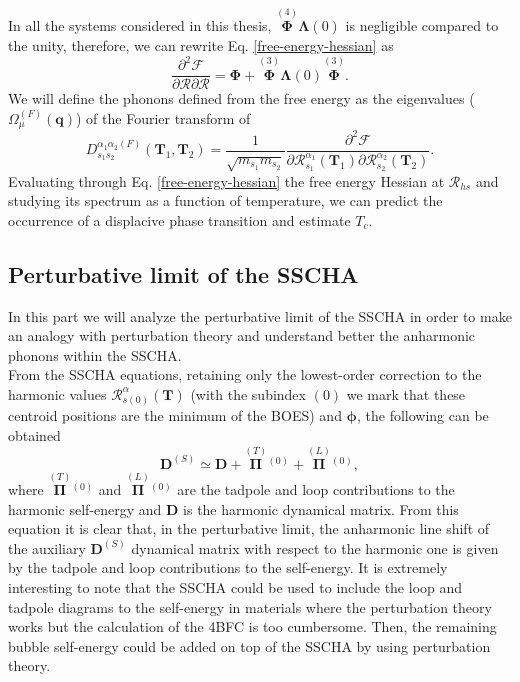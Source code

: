 In all the systems considered in this thesis, $\overset{(4)}{\boldsymbol{\Phi}}\boldsymbol{\Lambda}(0)$ is negligible compared to the unity, therefore, we can rewrite Eq. \ref{free-energy-hessian} as
\begin{equation}
 \frac{\partial^{2}\mathcal{F}}{\partial\boldsymbol{\mathcal{R}}\partial\boldsymbol{\mathcal{R}}}=\boldsymbol{\Phi}+\overset{(3)}{\boldsymbol{\Phi}}\boldsymbol{\Lambda}(0)\overset{(3)}{\boldsymbol{\Phi}}.
\end{equation}
We will define the phonons defined from the free energy as the eigenvalues ($\Omega^{(F)}_{\mu}(\boldsymbol{q})$) of
the Fourier transform of
\begin{equation}
 \label{free-energy-dynamical-matrix}
 D_{s_{1}s_{2}}^{\alpha_{1}\alpha_{2}(F)}(\mathbf{T}_{1},\mathbf{T}_{2})=\frac{1}{\sqrt{m_{s_{1}}m_{s_{2}}}}\frac{\partial^{2}\mathcal{F}}{\partial\mathcal{R}_{s_{1}}^{\alpha_{1}}(\mathbf{T}_{1})\partial\mathcal{R}_{s_{2}}^{\alpha_{
 2}}(\mathbf{T}_{2})}.
\end{equation} 
Evaluating through Eq. \ref{free-energy-hessian} the free energy Hessian at $\boldsymbol{\mathcal{R}}_{hs}$ and studying its spectrum as a function of temperature, we can predict the occurrence of a displacive phase transition 
and estimate $T_{c}$. 

\subsection{Perturbative limit of the SSCHA}
\label{pertubative-limit-sscha}

In this part we will analyze the perturbative limit of the SSCHA in order to make an analogy with perturbation theory and understand better the anharmonic phonons within the SSCHA. \\

From the SSCHA equations, retaining only the lowest-order correction to the harmonic values $\mathcal{R}_{s(0)}^{\alpha}(\mathbf{T})$ (with the subindex $(0)$ we mark that these centroid positions are the minimum of the BOES) and 
$\boldsymbol{\phi}$, the following can be obtained\cite{bianco2017second}
\begin{equation}
 \mathbf{D}^{(S)}\simeq\mathbf{D}+\overset{(T)}{\boldsymbol{\Pi}}{}^{(0)}+\overset{(L)}{\boldsymbol{\Pi}}{}^{(0)},
\end{equation}
where $\overset{(T)}{\boldsymbol{\Pi}}{}^{(0)}$ and $\overset{(L)}{\boldsymbol{\Pi}}{}^{(0)}$ are the tadpole and loop contributions to the harmonic self-energy and $\mathbf{D}$ is the harmonic dynamical matrix. From 
this equation it is clear that, in the perturbative limit, the anharmonic line shift of the auxiliary $\mathbf{D}^{(S)}$ dynamical matrix with respect to the harmonic one is given by the tadpole and loop 
contributions to the self-energy. It is extremely interesting to note that the SSCHA could be used to include the loop and tadpole diagrams to the self-energy in materials where the perturbation theory works but 
the calculation of the 4BFC is too cumbersome. Then, the remaining bubble self-energy could be added on top of the SSCHA by using perturbation theory\cite{paulatto2015first}. \\

